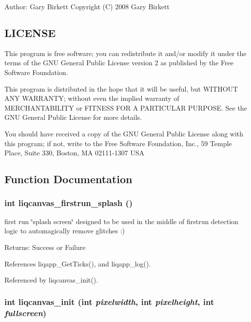 \begin{Desc}
\item[Author:]Gary Birkett Copyright (C) 2008 Gary Birkett\end{Desc}
\subsection{LICENSE}\label{d7/db4/liqcell__prop_8c_LICENSE}
This program is free software; you can redistribute it and/or modify it under the terms of the GNU General Public License version 2 as published by the Free Software Foundation.

This program is distributed in the hope that it will be useful, but WITHOUT ANY WARRANTY; without even the implied warranty of MERCHANTABILITY or FITNESS FOR A PARTICULAR PURPOSE. See the GNU General Public License for more details.

You should have received a copy of the GNU General Public License along with this program; if not, write to the Free Software Foundation, Inc., 59 Temple Place, Suite 330, Boston, MA 02111-1307 USA 

\subsection{Function Documentation}
\subsubsection[{liqcanvas\_\-firstrun\_\-splash}]{\setlength{\rightskip}{0pt plus 5cm}int liqcanvas\_\-firstrun\_\-splash ()}\label{d6/df5/liqcanvas_8c_28541ca509c0f3205eb7e170afabd2d8}


first run \char`\"{}splash screen\char`\"{} designed to be used in the middle of firstrun detection logic to automagically remove glitches :) \begin{Desc}
\item[Returns:]Success or Failure \end{Desc}


References liqapp\_\-GetTicks(), and liqapp\_\-log().

Referenced by liqcanvas\_\-init().
\subsubsection[{liqcanvas\_\-init}]{\setlength{\rightskip}{0pt plus 5cm}int liqcanvas\_\-init (int {\em pixelwidth}, \/  int {\em pixelheight}, \/  int {\em fullscreen})}\label{d6/df5/liqcanvas_8c_f779cfa1bb880b708379639904ae0703}


